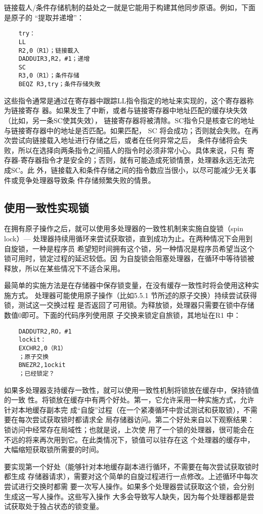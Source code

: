 链接载人/条件存储机制的益处之一就是它能用于构建其他同步原语。例如，下面是原子的
“提取并递增”：
\begin{verbatim}
    try：
    LL
    R2,0（R1）；链接載入
    DADDUIR3,R2，#1；递增
    SC
    R3,0（R1）；条件存储
    BEQZ R3,try；条件存储失敗
\end{verbatim}
这些指令通常是通过在寄存器中跟踪LL指令指定的地址来实现的，这个寄存器称为链接寄存
器。如果发生了中断，或者与链接寄存器中地址匹配的缓存块失效（比如，另一条SC使其失效），
链接寄存器将被清除。SC指令只是核查它的地址与链接寄存器中的地址是否匹配。如果匹配，
SC 将会成功；否则就会失败。在再次尝试向链接载入地址进行存储之后，或者在任何异常之后，
条件存储将会失败，所以在选择向两条指令之间插人的指令时必须非常小心。具体来说，只有
寄存器-寄存器指令才是安全的；否则，就有可能造成死锁情景，处理器永远无法完成SC。此
外，链接载入和条件存储之间的指令数应当很小，以尽可能减少无关事件或竞争处理器导致条
件存储频繁失败的情景。

\subsection{使用一致性实现锁}
在拥有原子操作之后，就可以使用多处理器的一致性机制来实施自旋锁（spin lock）—
处理器持续用循环来尝试获取锁，直到成功为止。在两种情况下会用到自旋锁，一种是程序员
希望短时间拥有这个锁，另一种情况是程序员希望当这个锁可用时，锁定过程的延迟较低。因
为自旋锁会阻塞处理器，在循环中等待锁被释放，所以在某些情况下不适合采用。

最简单的实施方法是在存储器中保存锁变量，在没有缓存一致性时将会使用这种实施方式。
处理器可能使用原子操作（比如5.5.1 节所述的原子交换）持续尝试获得锁，测试这一交换过程
是否返回了可用锁。为释放锁，处理器只需要在锁中存储数值0即可。下面的代码序列使用原
子交换来锁定自旅锁，其地址在R1 中：
\begin{verbatim}
    DADDUTR2,RO，#1
    lockit：
    EXCHR2,0（R1）
    ；原子交换
    BNEZR2,1ockit
    ；已经锁定？
\end{verbatim}
如果多处理器支持缓存一致性，就可以使用一致性机制将锁放在缓存中，保持锁值的一致
性。将锁放在缓存中有两个好处。第一，它允许采用一种实施方式，允许针对本地缓存副本完
成“自旋”过程（在一个紧凑循环中尝试测试和获取锁），不需要在每次尝试获取锁时都请求全
局存储器访问。第二个好处来自以下观察结果：锁访问中经常存在局域性；也就是说，上次使
用了一个锁的处理器，很可能会在不远的将来再次用到它。在此类情况下，锁值可以驻存在这
个处理器的缓存中，大幅缩短获取锁所需要的时间。

要实现第一个好处（能够针对本地缓存副本进行循环，不需要在每次尝试获取锁时都生成
存储器请求），需要对这个简单的自旋过程进行一点修改。上述循环中每次尝试进行交换时都需
要一次写人操作。如果多个处理器尝试获取这个锁，会分别生成这一写人操作。这些写入操作
大多会导致写人缺失，因为每个处理器都是尝试获取处于独占状态的锁变量。


